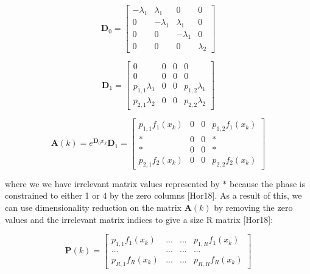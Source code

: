 \documentclass[a4paper,11pt,titlepage]{article}
\begin{document}
\begin{equation}
    \mathbf{D}_0 = \begin{bmatrix}
     -\lambda_1 & \lambda_1 & 0 & 0 \\
     0 & -\lambda_1 & \lambda_1 & 0 \\
     0 & 0 & -\lambda_1 & 0 \\
     0 & 0 & 0 & \lambda_2
    \end{bmatrix}
    \label{D0_comp_cheap}
\end{equation}

\begin{equation}
    \mathbf{D}_1 = \begin{bmatrix}
     0 & 0 & 0 & 0 \\
     0 & 0 & 0 & 0 \\
     p_{1,1} \lambda_1 & 0 & 0 & p_{1,2} \lambda_1 \\
     p_{2,1} \lambda_2 & 0 & 0 & p_{2,2} \lambda_2
    \end{bmatrix}
    \label{D0_comp_cheap}
\end{equation}

\begin{equation}
    \mathbf{A}(k) = e^{\mathbf{D}_0 x_k} \mathbf{D}_1 = \begin{bmatrix}
     p_{1,1} f_1(x_k) & 0 & 0 & p_{1,2} f_1(x_k) \\
     * & 0 & 0 & * \\
    * & 0 & 0 & * \\
     p_{2,1} f_2(x_k) & 0 & 0 & p_{2,2} f_2(x_k)
    \end{bmatrix}
    \label{D0_comp_cheap}
\end{equation}

where we we have irrelevant matrix values represented by $*$ because the phase is constrained to either 1 or 4 by the zero columns [Hor18]. As a result of this, we can use dimensionality reduction on the matrix $\mathbf{A}(k)$ by removing the zero values and the irrelevant matrix indices to give a size R matrix [Hor18]: 

\begin{equation}
    \mathbf{P}(k) = \begin{bmatrix}
     p_{1,1} f_1(x_k) & ... & ... & p_{1,R} f_1(x_k) \\
     ... & ... & ... & ... \\
     p_{R,1} f_R(x_k) & ... & ... & p_{R,R} f_R(x_k)
    \end{bmatrix}
\end{equation}
\end{document}
